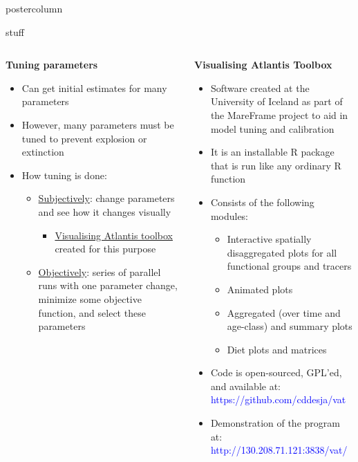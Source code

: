 \documentclass[final,hyperref={pdfpagelabels=false}]{beamer}
\begin{document}
\begin{frame}
\begin{columns}
\begin{column}{1\textwidth}
\begin{beamercolorbox}[center,wd=\textwidth]{postercolumn}
\begin{minipage}[T]{.98\textwidth}
{\begin{block}{stuff}
\begin{columns}
\begin{column}{.49\textwidth}
              \vspace{.5cm}
               \centering \textbf{Tuning parameters}
               \vspace{.5cm}
            
            \begin{itemize}
            \item Can get initial estimates for many parameters
	  \item However, many parameters must be tuned to prevent explosion or extinction
	\item How tuning is done:
		\begin{itemize}
			\item \underline{Subjectively}: change parameters and see how it changes visually 
			\begin{itemize}
			\item \underline{Visualising Atlantis toolbox} created for this purpose
			\end{itemize}
			\item \underline{Objectively}: series of parallel runs with one parameter change, minimize some objective function, and select these parameters 
		\end{itemize}
            \end{itemize}
            \end{column}
            \begin{column}{.49\textwidth}
            
    
           
              \centering \textbf{Visualising Atlantis Toolbox}
            
            \begin{itemize}
            	\item Software created at the University of Iceland as part of the MareFrame project to aid in model tuning and calibration
	\item It is an installable R package that is run like any ordinary R function
	\item Consists of the following modules:
		\begin{itemize}
			\item Interactive spatially disaggregated plots for all functional groups and tracers
			\item Animated plots
			\item Aggregated (over time and age-class) and summary plots
			\item Diet plots and matrices
		\end{itemize}
	\item Code is open-sourced, GPL'ed, and available at: \textcolor{blue}{https://github.com/cddesja/vat}
	\item Demonstration of the program at: \textcolor{blue}{http://130.208.71.121:3838/vat/}
            \end{itemize}
            

\end{column}
\end{columns}
\end{block}}
\end{minipage}
\end{beamercolorbox}
\end{column}
\end{columns}
\end{frame}
\end{document}
